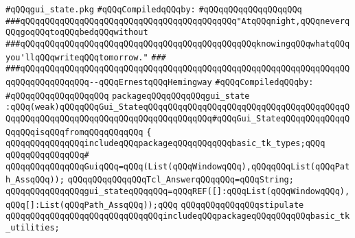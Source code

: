 \label{src/lib/tk/src/gui_state.pkg}
\verb|#qQQqgui_state.pkg|\newline
\newline
\verb|#qQQqCompiledqQQqby:|\newline
\verb|#qQQqqQQqqQQqqQQqqQQq|\newline
\newline
\verb|###qQQqqQQqqQQqqQQqqQQqqQQqqQQqqQQqqQQqqQQqqQQq"AtqQQqnight,qQQqneverqQQqgoqQQqtoqQQqbedqQQqwithout|\newline
\verb|###qQQqqQQqqQQqqQQqqQQqqQQqqQQqqQQqqQQqqQQqqQQqqQQqknowingqQQqwhatqQQqyou'llqQQqwriteqQQqtomorrow."|\newline
\verb|###|\newline
\verb|###qQQqqQQqqQQqqQQqqQQqqQQqqQQqqQQqqQQqqQQqqQQqqQQqqQQqqQQqqQQqqQQqqQQqqQQqqQQqqQQqqQQq--qQQqErnestqQQqHemingway|\newline
\newline
\verb|#qQQqCompiledqQQqby:|\newline
\verb|#qQQqqQQqqQQqqQQqqQQq|\newline
\newline
\newline
\verb|packageqQQqqQQqqQQqgui_state|\newline
\verb|:qQQq(weak)qQQqqQQqGui_StateqQQqqQQqqQQqqQQqqQQqqQQqqQQqqQQqqQQqqQQqqQQqqQQqqQQqqQQqqQQqqQQqqQQqqQQqqQQqqQQqqQQq#qQQqGui_StateqQQqqQQqqQQqqQQqqQQqisqQQqfromqQQqqQQqqQQq|\newline
\verb|{|\newline
\verb|qQQqqQQqqQQqqQQqincludeqQQqpackageqQQqqQQqqQQqbasic_tk_types;qQQq|\newline
\verb|qQQqqQQqqQQqqQQq#|\newline
\verb|qQQqqQQqqQQqqQQqGuiqQQq=qQQq(List(qQQqWindowqQQq),qQQqqQQqList(qQQqPath_AssqQQq));|\newline
\newline
\verb|qQQqqQQqqQQqqQQqTcl_AnswerqQQqqQQq=qQQqString;|\newline
\newline
\verb|qQQqqQQqqQQqqQQqgui_stateqQQqqQQq=qQQqREF([]:qQQqList(qQQqWindowqQQq),qQQq[]:List(qQQqPath_AssqQQq));qQQq|\newline
\newline
\verb|qQQqqQQqqQQqqQQqstipulate|\newline
\verb|qQQqqQQqqQQqqQQqqQQqqQQqqQQqqQQqincludeqQQqpackageqQQqqQQqqQQqbasic_tk_utilities;|\newline
